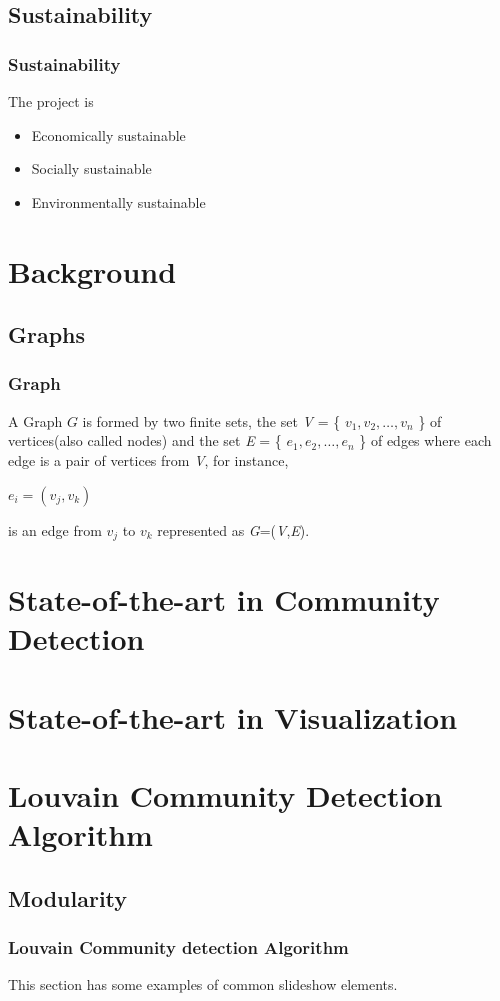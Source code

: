 \documentclass{beamer}
\begin{document}
\subsection{Sustainability}
\frame
{
\frametitle{Sustainability}
The project is 
\begin{itemize}
\item Economically sustainable
\item Socially sustainable
\item Environmentally sustainable
\end{itemize}
}
\section{Background}

\subsection[Few Theoretical Concepts]{Graphs}

\frame
{
	\frametitle{Graph}
	A Graph $G$ is formed by two finite sets, the set \textit{V} = \{ $v_1,v_2, \ldots ,v_n$ \} of vertices(also called nodes) and the set \textit{E} = \{ $e_1,e_2, \ldots,e_n$  \} of edges where each edge is a pair of vertices from \textit{V}, for instance,
\begin{center}
$e_i = (v_j,v_k)$
\end{center}
is an edge from $v_j$ to $v_k$ represented as \textit{G}=(\textit{V},\textit{E}).
}

\section{State-of-the-art in Community Detection}
\section{State-of-the-art in Visualization}
\section{Louvain Community Detection Algorithm}
\subsection{Modularity}

\frame
{
	\frametitle{Louvain Community detection Algorithm}

	This section has some examples of common slideshow elements.
}
\end{document}
